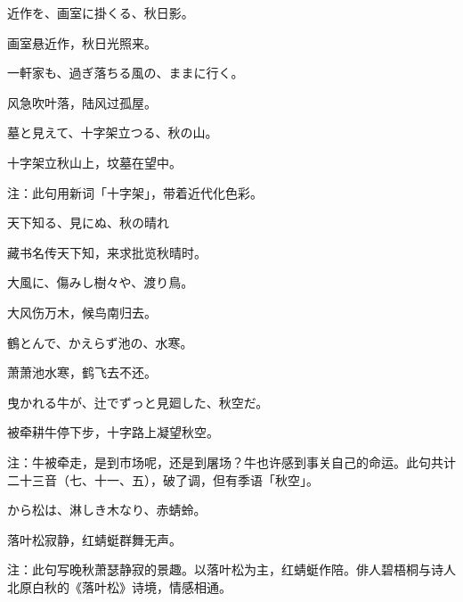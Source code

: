 \begin{haiku}
    {\FH 近作を、画室に掛くる、秋日影。}

    {\FK 画室悬近作，秋日光照来。}
\end{haiku}

\begin{haiku}
    {\FH 一軒家も、過ぎ落ちる風の、ままに行く。}

    {\FK 风急吹叶落，陆风过孤屋。}
\end{haiku}

\begin{haiku}
    {\FH 墓と見えて、十字架立つる、秋の山。}

    {\FK 十字架立秋山上，坟墓在望中。}

    {\FT 注：此句用新词「十字架」，带着近代化色彩。}
\end{haiku}

\begin{haiku}
    {\FH 天下知る、見にぬ、秋の晴れ}

    {\FK 藏书名传天下知，来求批览秋晴时。}
\end{haiku}

\begin{haiku}
    {\FH 大風に、傷みし樹々や、渡り鳥。}

    {\FK 大风伤万木，候鸟南归去。}
\end{haiku}

\begin{haiku}
    {\FH 鶴とんで、かえらず池の、水寒。}

    {\FK 萧萧池水寒，鹤飞去不还。}
\end{haiku}

\begin{haiku}
    {\FH 曳かれる牛が、辻でずっと見廻した、秋空だ。}

    {\FK 被牵耕牛停下步，十字路上凝望秋空。}

    {\FT 注：牛被牵走，是到市场呢，还是到屠场？牛也许感到事关自己的命运。此句共计二十三音（七、十一、五），破了调，但有季语「秋空」。}
\end{haiku}

\begin{haiku}
    {\FH から松は、淋しき木なり、赤蜻蛉。}

    {\FK 落叶松寂静，红蜻蜓群舞无声。}

    {\FT 注：此句写晚秋萧瑟静寂的景趣。以落叶松为主，红蜻蜓作陪。俳人碧梧桐与诗人北原白秋的《落叶松》诗境，情感相通。}
\end{haiku}


